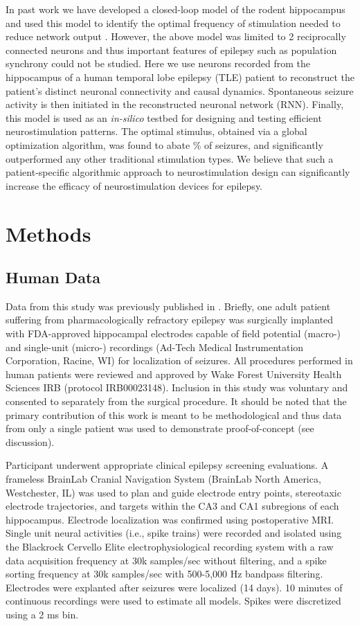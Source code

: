 \documentclass[11pt,a4paper,final]{article}
\begin{document}
In past work we have developed a closed-loop model of the rodent hippocampus and used this model to identify the optimal frequency of stimulation needed to reduce network output \citep{sandler15clpp}.
However, the above model was limited to 2 reciprocally connected neurons and thus important features of epilepsy such as population synchrony could not be studied.
Here we use \nn{} neurons recorded from the hippocampus of a human temporal lobe epilepsy (TLE) patient to reconstruct the patient's distinct neuronal connectivity and causal dynamics.
Spontaneous seizure activity is then initiated in the reconstructed neuronal network (RNN).
Finally, this model is used as an \textit{in-silico} testbed for designing and testing efficient neurostimulation patterns.
The optimal stimulus, obtained via a global optimization algorithm, was found to abate \success{}\% of seizures, and significantly outperformed any other traditional stimulation types.
We believe that such a patient-specific algorithmic approach to neurostimulation design can significantly increase the efficacy of neurostimulation devices for epilepsy.


\section{Methods \label{SM}}

\subsection{Human Data}

Data from this study was previously published in \citet{song16sparse}. 
Briefly, one adult patient suffering from pharmacologically refractory epilepsy was surgically implanted with FDA-approved hippocampal electrodes capable of field potential (macro-) and single-unit (micro-) recordings (Ad-Tech Medical Instrumentation Corporation, Racine, WI) for localization of seizures. 
All procedures performed in human patients were reviewed and approved by Wake Forest University Health Sciences IRB (protocol IRB00023148). 
Inclusion in this study was voluntary and consented to separately from the surgical procedure. 
It should be noted that the primary contribution of this work is meant to be methodological and thus data from only a single patient was used to demonstrate proof-of-concept (see discussion). 

Participant underwent appropriate clinical epilepsy screening evaluations. 
A frameless BrainLab Cranial Navigation System (BrainLab North America, Westchester, IL) was used to plan and guide electrode entry points, stereotaxic electrode trajectories, and targets within the CA3 and CA1 subregions of each hippocampus. 
Electrode localization was confirmed using postoperative MRI. 
Single unit neural activities (i.e., spike trains) were recorded and isolated using the Blackrock Cervello Elite electrophysiological recording system with a raw data acquisition frequency at 30k samples/sec without filtering, and a spike sorting frequency at 30k samples/sec with 500-5,000 Hz bandpass filtering.
Electrodes were explanted after seizures were localized (14 days).
10 minutes of continuous recordings were used to estimate all models.
Spikes were discretized using a 2 ms bin.
\end{document}
